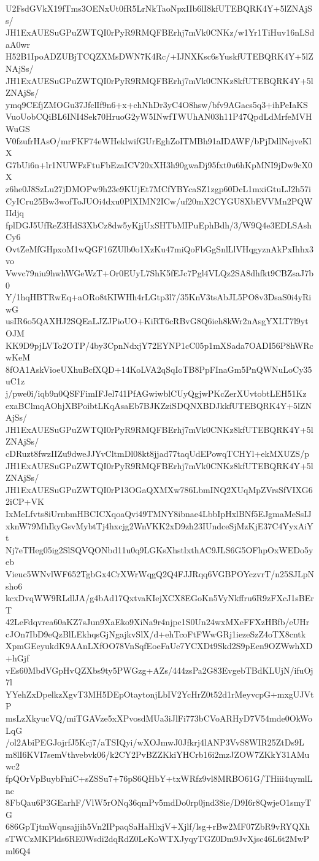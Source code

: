 U2FsdGVkX19fTms3OENxUt0fR5LrNkTaoNpxIIb6lI8kfUTEBQRK4Y+5lZNAjSs/
JH1ExAUESuGPuZWTQI0rPyR9RMQFBErhj7mVk0CNKz/w1Yr1TiHuv16nLSdaA0wr
H52B1IpoADZUBjTCQZXMsDWN7K4Rc/+IJNXKsc6sYuskfUTEBQRK4Y+5lZNAjSs/
JH1ExAUESuGPuZWTQI0rPyR9RMQFBErhj7mVk0CNKz8kfUTEBQRK4Y+5lZNAjSs/
ymq9CEfjZMOGu37JfclIf9n6+x+chNhDr3yC4O8hsw/bfv9AGacs5q3+ihPeIaKS
VuoUobCQiBL6INI4Sek70HruoG2yW5INwfTWUhAN03h11P47QpdLdMrfeMVHWuGS
V0fzufrHAsO/mrFKF74eWHeklwifGUrEghZoITMBh91aIDAWF/bPjDdlNejveKlX
G7bUi6n+lr1NUWFzFtuFbEzaICV20xXH3h90gwaDj95fxt0u6hKpMNI9jDw9cX0X
z6he0J8SzLu27jDMOPw9h23e9KUjEt7MCfYBYcaSZ1zgp60DcL1mxiGtuLJ2h57i
CyICru25Bw3wofToJUOi4dxu0PlXIMN2ICw/uf20mX2CYGU8XbEVVMn2PQWIIdjq
fplDGJ5UfReZ3HdS3XbCz8dw5yKjjUxSHTbMIPuEphBdh/3/W9Q4e3EDLSAshCy6
OvtZeMfGHpxoM1wQGF16ZUlb0o1XzKu47miQoFbGgSnlLlVHqgyznAkPxIhhx3vo
Vwvc79niu9hwhWGeWzT+Or0EUyL7ShK5fEJc7Pgl4VLQz2SA8dhfkt9CBZsaJ7b0
Y/1hqHBTRwEq+aORo8tKIWHh4rLGtp3l7/35KnV3tsAbJL5PO8v3DsaS0i4yRiwG
usIR6o5QAXHJ2SQEaLJZJPioUO+KiRT6cRBvG8Q6ieh8kWr2nAsgYXLT7l9ytOJM
KK9D9pjLVTo2OTP/4by3CpnNdxjY72EYNP1cC05p1mXSada7OADI56P8hWRcwKeM
8fOA1AskVioeUXhuBcfXQD+14KoLVA2qSqIoTB8PpFInaGm5PnQWNuLoCy35uC1z
j/pwe0i/iqb9n0QSFFimIFJel741PfAGwiwblCUyQgjwPKcZerXUvtobtLEH51Kz
exaBClmqAOhjXBPoibtLKqAsaEb7BJKZziSDQNXBDJkkfUTEBQRK4Y+5lZNAjSs/
JH1ExAUESuGPuZWTQI0rPyR9RMQFBErhj7mVk0CNKz8kfUTEBQRK4Y+5lZNAjSs/
cDRuzt8fwzIIZu9dweJJYvCltmDl08kt8jjad77taqUdEPowqTCHYl+ekMXUZS/p
JH1ExAUESuGPuZWTQI0rPyR9RMQFBErhj7mVk0CNKz8kfUTEBQRK4Y+5lZNAjSs/
JH1ExAUESuGPuZWTQI0rP13OGaQXMXw786LbmINQ2XUqMpZVrsSfVIXG62iCP+VK
IxMeLfvts8iUrnbmHBCICXqoaQvi49TMNY8ibnae4LbbIpHxlBNf5EJgmaMeSsIJ
xknW79MhIkyGsvMybtTj4hxcjg2WnVKK2xD9zh23IUndceSjMzKjE37C4YyxAiYt
Nj7eTHeg05ig2SlSQVQONbd11u0q9LGKsXhstlxthAC9JLS6G5OFhpOxWEDo5yeb
Vieuc5WNvlWF652TgbGx4CrXWrWqgQ2Q4FJJRqq6VGBPOYczvrT/n25SJLpNsho6
kcxDvqWW9RLdlJA/g4bAd17QxtvaKIejXCX8EGoKn5VyNkffru6R9zFXcJ1sBErT
42LeFdqvrea60aKZ7sJun9XaEko9XiNa9r4njpc1S0Un24wxMXeFFXzHBfb/eUHr
cJOn7IbD9eQzBlLEkhqsGjNgajkvSlX/d+ehTcoFtFWwGRj1iezeSzZ4oTX8cntk
XpmGEeyukdK9AAnLXfOO78VnSqfEoeFaUe7YCXDt9Skd2S9pEen9OZWwhXD+hGjf
vEs60MbdVGpHvQZXbs9ty5PWGzg+AZs/444zsPa2G83EvgebTBdKLUjN/ifuOj7l
YYehZxDpelkzXgvT3MH5DEpOtaytonjLbIV2YcHrZ0t52d1rMeyvcpG+mxgUJVtP
msLzXkyucVQ/miTGAVze5xXPvosdMUa3iJlFi773bCVoARHyD7V54mde0OkWoLqG
/ol2AbiPEGJojrfJ5Kcj7/aTSIQyi/wXOJmwJ0Jfkrj4lANP3VvS8WIR25ZtDs9L
m8lI6KVI7semVthvebvk06/k2CY2PvBZZKkiYHCrb16i2mzJZOW7ZKkY31AMuwc2
fpQOrVpBuybFniC+sZSSu7+76pS6QHbY+txWRfz9vl8MRBO61G/THiii4uymlLnc
8FbQau6P3GEarhF/VlW5rONq36qmPv5mdDo0rp0jnd38ie/D9I6r8QwjeO1smyTG
686GpTjtmWqnsajjih5Vn2IPpaqSaHaHlxjV+Xjlf/lsg+rBw2MF07ZbR9vRYQXh
sTWCzMKPlds6RE0Wsdi2dqRdZ0LeKoWTXJyqyTGZ0Dm9JvXjsc46L6t2MwPml6Q4

